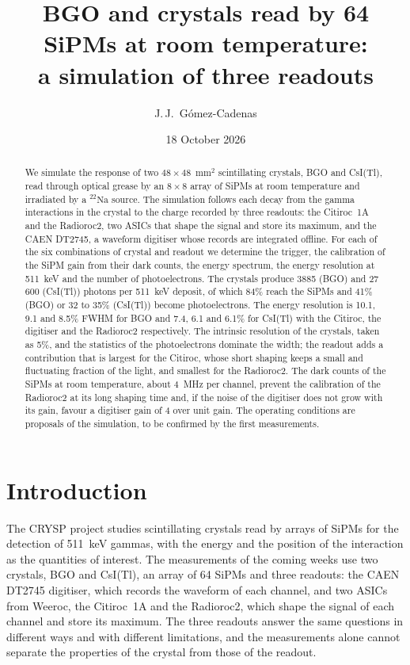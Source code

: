 \documentclass[11pt]{article}
\title{BGO and \csitl crystals read by 64 SiPMs at room temperature:\\
a simulation of three readouts}
\author{J.\,J.~Gómez-Cadenas}
\date{18 October 2026}
\newcommand{\Na}{\ensuremath{{}^{22}\mathrm{Na}}\xspace}
\newcommand{\csitl}{CsI(Tl)\xspace}
\begin{document}
\maketitle

\begin{abstract}
We simulate the response of two $48 \times 48$~mm$^2$ scintillating
crystals, BGO and \csitl, read through optical grease by an $8 \times 8$
array of SiPMs at room temperature and irradiated by a \Na source. The
simulation follows each decay from the gamma interactions in the crystal to
the charge recorded by three readouts: the Citiroc~1A and the Radioroc2,
two ASICs that shape the signal and store its maximum, and the CAEN DT2745,
a waveform digitiser whose records are integrated offline. For each of the
six combinations of crystal and readout we determine the trigger, the
calibration of the SiPM gain from their dark counts, the energy spectrum,
the energy resolution at 511~keV and the number of photoelectrons. The
crystals produce 3885 (BGO) and 27\,600 (\csitl) photons per 511~keV
deposit, of which 84\% reach the SiPMs and 41\% (BGO) or 32 to 35\%
(\csitl) become photoelectrons. The energy resolution is 10.1, 9.1 and
8.5\% FWHM for BGO and 7.4, 6.1 and 6.1\% for \csitl with the Citiroc, the
digitiser and the Radioroc2 respectively. The intrinsic resolution of the
crystals, taken as 5\%, and the statistics of the photoelectrons dominate
the width; the readout adds a contribution that is largest for the
Citiroc, whose short shaping keeps a small and fluctuating fraction of the
light, and smallest for the Radioroc2. The dark counts of the SiPMs at room
temperature, about 4~MHz per channel, prevent the calibration of the
Radioroc2 at its long shaping time and, if the noise of the digitiser
does not grow with its gain, favour a digitiser gain of 4 over unit gain.
The operating conditions are proposals of the simulation, to be confirmed
by the first measurements.
\end{abstract}

\tableofcontents

\section{Introduction}

The CRYSP project studies scintillating crystals read by arrays of SiPMs for
the detection of 511~keV gammas, with the energy and the position of the
interaction as the quantities of interest. The measurements of the coming
weeks use two crystals, BGO and \csitl, an array of 64 SiPMs and three
readouts: the CAEN DT2745 digitiser, which records the waveform of each
channel, and two ASICs from Weeroc, the Citiroc~1A and the Radioroc2, which
shape the signal of each channel and store its maximum. The three readouts
answer the same questions in different ways and with different
limitations, and the measurements alone cannot separate the properties of
the crystal from those of the readout.
\end{document}
